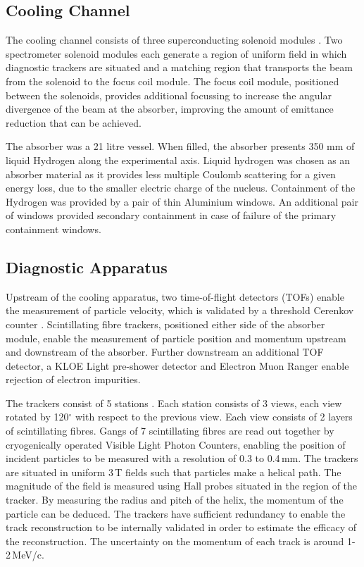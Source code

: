 \subsection{Cooling Channel}
The cooling channel consists of three superconducting solenoid modules \cite{SS} 
\cite{FC}. Two spectrometer solenoid modules each generate a region of uniform 
field in which diagnostic trackers are situated and a matching region that 
transports the beam from the solenoid to the focus coil module. The focus coil 
module, positioned between the solenoids, provides additional focussing to 
increase the angular divergence of the beam at the absorber, improving the 
amount of emittance reduction that can be achieved.

The absorber was a 21 litre vessel. When filled, the absorber presents 350 mm 
of liquid Hydrogen along the experimental axis. Liquid hydrogen was chosen as an 
absorber material as it provides less multiple Coulomb  scattering for a given 
energy loss, due to the smaller electric charge of the nucleus. Containment of
the Hydrogen was provided by a pair of thin Aluminium windows. An additional
pair of windows provided secondary containment in case of failure of the primary
containment windows.

\subsection{Diagnostic Apparatus}
Upstream of the cooling apparatus, two time-of-flight detectors (TOFs) 
\cite{tof} \cite{tof2} enable the measurement of particle velocity, which is 
validated by a threshold Cerenkov counter \cite{ckov}. Scintillating fibre 
trackers, positioned either side of the absorber module, enable the measurement 
of particle position and momentum upstream and downstream of the absorber. 
Further downstream an additional TOF detector, a KLOE Light pre-shower detector 
and Electron Muon Ranger enable rejection of electron impurities.

The trackers consist of 5 stations \cite{tracker_hardware} 
\cite{tracker_software}. Each station consists of 3 views, each view rotated by 
120$^\circ$ with respect to the previous view. Each view consists of 2 layers of 
scintillating fibres. Gangs of 7 scintillating fibres are read out together by 
cryogenically operated Visible Light Photon Counters, enabling the position of 
incident particles to be measured with a resolution of 0.3 to 0.4\,mm. The 
trackers are situated in uniform 3\,T fields such that particles make a helical 
path. The magnitude of the field is measured using Hall probes situated in the 
region of the tracker. By measuring the radius and pitch of the helix, the 
momentum of the particle can be deduced. The trackers have sufficient redundancy 
to enable the track reconstruction to be internally validated in order to 
estimate the efficacy of the reconstruction. The uncertainty on the momentum of 
each track is around 1-2\,MeV/c.

